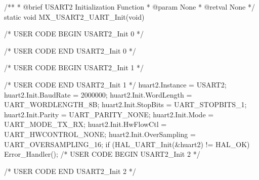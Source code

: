 /**
  * @brief USART2 Initialization Function
  * @param None
  * @retval None
  */
static void MX_USART2_UART_Init(void)
{

  /* USER CODE BEGIN USART2_Init 0 */

  /* USER CODE END USART2_Init 0 */

  /* USER CODE BEGIN USART2_Init 1 */

  /* USER CODE END USART2_Init 1 */
  huart2.Instance = USART2;
  huart2.Init.BaudRate = 2000000;
  huart2.Init.WordLength = UART_WORDLENGTH_8B;
  huart2.Init.StopBits = UART_STOPBITS_1;
  huart2.Init.Parity = UART_PARITY_NONE;
  huart2.Init.Mode = UART_MODE_TX_RX;
  huart2.Init.HwFlowCtl = UART_HWCONTROL_NONE;
  huart2.Init.OverSampling = UART_OVERSAMPLING_16;
  if (HAL_UART_Init(&huart2) != HAL_OK)
  {
    Error_Handler();
  }
  /* USER CODE BEGIN USART2_Init 2 */

  /* USER CODE END USART2_Init 2 */

}

